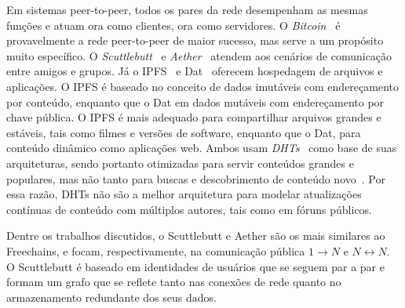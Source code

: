 \documentclass[12pt]{article}
\newcommand{\FC} {Freechains\xspace}
\newcommand{\Xon} {$1{\rightarrow}N$\xspace}
\newcommand{\Xnn} {$N{\leftrightarrow}N$\xspace}
\begin{document}
Em sistemas peer-to-peer, todos os pares da rede desempenham as mesmas funções
e atuam ora como clientes, ora como servidores.
O \emph{Bitcoin}~\cite{p2p.bitcoin} é provavelmente a rede peer-to-peer de
maior sucesso, mas serve a um propósito muito específico.
O \emph{Scuttlebutt}~\cite{p2p.scuttlebutt} e \emph{Aether}~\cite{TODO} atendem
aos cenários de comunicação entre amigos e grupos.
Já o IPFS~\cite{p2p.ipfs} e Dat~\cite{p2p.dat} oferecem hospedagem de arquivos
e aplicações.
O IPFS é baseado no conceito de dados imutáveis com endereçamento por conteúdo,
enquanto que o Dat em dados mutáveis com endereçamento por chave pública.
O IPFS é mais adequado para compartilhar arquivos grandes e estáveis, tais como
filmes e versões de software, enquanto que o Dat, para conteúdo dinâmico como
aplicações web.
Ambos usam \emph{DHTs}~\cite{TODO} como base de suas arquiteturas, sendo
portanto otimizadas para servir conteúdos grandes e populares, mas não tanto
para buscas e descobrimento de conteúdo novo~\cite{TODO}.
Por essa razão, DHTs não são a melhor arquitetura para modelar atualizações
contínuas de conteúdo com múltiplos autores, tais como em fóruns públicos.

Dentre os trabalhos discutidos, o Scuttlebutt e Aether são os mais similares ao
\FC, e focam, respectivamente, na comunicação pública \Xon e \Xnn.
O Scuttlebutt é baseado em identidades de usuários que se seguem par a par e
formam um grafo que se reflete tanto nas conexões de rede quanto no
armazenamento redundante dos seus dados.
\end{document}
